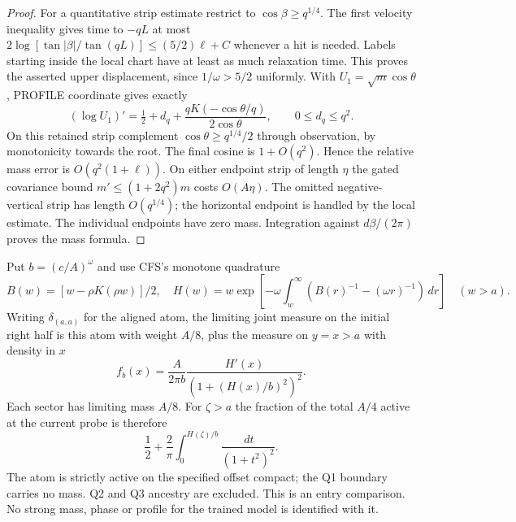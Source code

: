 \documentclass[11pt]{article}
\newcommand{\dd}{\,d}\newcommand{\E}{\mathbb E}
\begin{document}
\begin{proof}
For a quantitative strip estimate restrict to \(\cos\beta\ge q^{1/4}\).
The first velocity inequality gives time to \(-qL\) at most
\(2\log[\tan|\beta|/\tan(qL)]\le(5/2)\ell+C\) whenever a hit is
needed. Labels starting inside the local chart have at least as much
relaxation time. This proves the asserted upper displacement, since
\(1/\omega>5/2\) uniformly.
With \(U_1=\sqrt m\cos\theta\), PROFILE coordinate gives exactly
\[
 (\log U_1)'=\tfrac12+d_q+
 \frac{qK(-\cos\theta/q)}{2\cos\theta},\qquad 0\le d_q\le q^2 .
\]
On this retained strip complement \(\cos\theta\ge q^{1/4}/2\)
through observation, by monotonicity towards the root. The final
cosine is \(1+O(q^2)\). Hence the relative mass error is
\(O(q^2(1+\ell))\). On either endpoint strip of length \(\eta\)
the gated covariance bound \(m'\le(1+2q^2)m\) costs \(O(A\eta)\).
The omitted negative-vertical strip has length \(O(q^{1/4})\);
the horizontal endpoint is handled by the local estimate. The
individual endpoints have zero mass. Integration against
\(d\beta/(2\pi)\) proves the mass formula.
\end{proof}

Put \(b=(c/A)^\omega\) and use CFS's monotone quadrature
\[
 B(w)=[w-\rho K(\rho w)]/2,\quad
 H(w)=w\exp\left[-\omega\int_w^\infty
       \left(B(r)^{-1}-(\omega r)^{-1}\right)\dd r\right]\quad(w>a).
\]
Writing \(\delta_{(a,a)}\) for the aligned atom, the limiting joint
measure on the initial right half is this atom with weight \(A/8\),
plus the measure on \(y=x>a\) with density in \(x\)
\[
 f_b(x)=\frac{A}{2\pi b}\frac{H'(x)}{(1+(H(x)/b)^2)^2}.
\]
Each sector has limiting mass \(A/8\). For \(\zeta>a\) the fraction of
the total \(A/4\) active at the current probe is therefore
\begin{equation}\label{an04rpsv1:fraction}
 \frac12+\frac2\pi\int_0^{H(\zeta)/b}\frac{\dd t}{(1+t^2)^2}.
\end{equation}
The atom is strictly active on the specified offset compact; the Q1
boundary carries no mass. Q2 and Q3 ancestry are excluded. This is
an entry comparison. No strong mass, phase or profile for the trained
model is identified with it.
\end{document}
